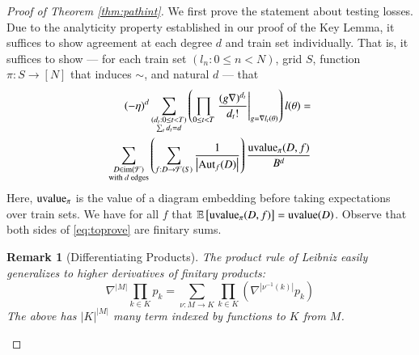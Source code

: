 \documentclass[anon,12pt]{colt2021} %
\newtheorem{rmk}{Remark}
\newcommand{\wrap}[1]{\left(#1\right)}
\newcommand{\wabs}[1]{\left|#1\right|}
\newcommand{\Free}{\mathcal{F}}
\newcommand{\Aut}{\text{\textnormal{Aut}}}
\newcommand{\image}{\text{\textnormal{im}}}
\newcommand{\uvalue}{\text{\textnormal{uvalue}}}
\newcommand{\expct}[1]{\mathbb{E}\left[#1\right]}
\begin{document}
{        \begin{proof}[Proof of Theorem \ref{thm:pathint}]
            We first prove the statement about testing losses.
            Due to the analyticity property established in our proof of the
            Key Lemma, it suffices to show agreement at each degree $d$ and
            train set individually.  That is, it suffices to show --- for
            each train set $(l_n: 0\leq n<N)$, grid $S$, function $\pi:
            S\to [N]$ that induces $\sim$, and natural $d$ --- that
            \begin{align} \label{eq:toprove}
                (-\eta)^d
                \sum_{\substack{
                    (d_t: 0\leq t<T) \\
                    \sum_t d_t = d
                }}
                \wrap{
                    \prod_{0 \leq t < T} \left.
                        \frac{(g \nabla)^{d_t}}{d_t!}
                    \right|_{g=\nabla l_t(\theta)}
                } l (\theta)
                = \nonumber \\
                \sum_{\substack{
                    D \in \image(\Free) \\
                    \textnormal{with $d$ edges}
                }}
                \wrap{
                    \sum_{f: D\to\Free(S)}
                    \frac{1}{\wabs{\Aut_f(D)}}
                }
                \frac{\uvalue_\pi(D, f)}{B^{d}}
            \end{align}
            Here, $\uvalue_\pi$ is the value of a diagram embedding before
            taking expectations over train sets.  We have for all $f$ that
            $\expct{\uvalue_\pi(D, f)} = \uvalue(D)$.
            Observe that both sides of \ref{eq:toprove} are finitary sums.

            \begin{rmk}[Differentiating Products] \label{rmk:leibniz}
                The product rule of Leibniz easily generalizes to higher
                derivatives of finitary products:
                $$
                    \nabla^{\wabs{M}} \prod_{k \in K} p_k
                    = 
                    \sum_{\nu:M\to K} \prod_{k\in K} \wrap{
                        \nabla^{\wabs{\nu^{-1}(k)}} p_k
                    }
                $$
                The above has $\wabs{K}^{\wabs{M}}$ many term indexed by
                functions to $K$ from $M$.
            \end{rmk}


\end{proof}}
\end{document}
